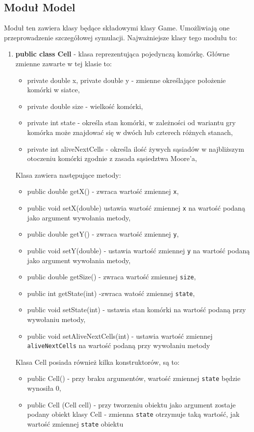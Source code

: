 \documentclass[10pt, oneside]{article}
\begin{document}
\subsection {Moduł Model}
Moduł ten zawiera klasy będące składowymi klasy Game. Umożliwiają one przeprowadzenie szczegółowej symulacji. Najważniejsze klasy tego modułu to:
\begin {enumerate}
\item  \textbf{ public class Cell} - klasa reprezentująca pojedynczą komórkę. Główne zmienne zawarte w tej klasie to:
	\begin{itemize}
		\item private double x, private double y - zmienne określające położenie komórki w siatce,
		\item private double size -  wielkość komórki,
		\item private int state -  określa stan komórki, w zależności od wariantu gry komórka może znajdować się w dwóch lub czterech różnych stanach,
		\item private int aliveNextCells - określa ilość żywych sąsiadów w najbliższym otoczeniu komórki zgodnie z zasada sąsiedztwa Moore'a,
	\end{itemize}
	
	Klasa zawiera następujące metody:
	\begin{itemize}
	\item public double getX() - zwraca wartość zmiennej \texttt{x},
	\item public void setX(double)  ustawia wartość zmiennej \texttt {x} na wartość podaną jako argument wywołania metody,
	\item public double getY() - zwraca wartość zmiennej \texttt{y},
	\item  public void setY(double) - ustawia wartość zmiennej \texttt{y}  na wartość podaną jako argument wywołania metody,
	\item  public double getSize() - zwraca wartość zmiennej \texttt{size},
	\item public int getState(int) -zwraca watość zmiennej \texttt{state},
	\item public void setState(int) - ustawia stan komórki na wartość podaną przy wywołaniu metody,
	\item public void setAliveNextCells(int) - ustawia wartość zmiennej \texttt {aliveNextCells} na wartość podaną przy wywołaniu metody
	\end{itemize}

	Klasa Cell posiada również kilka konstruktorów, są to:
	\begin{itemize}
	\item public Cell() - przy braku argumentów, wartość zmiennej \texttt{state} będzie wynosiła 0,
	\item public Cell (Cell cell) - przy tworzeniu obiektu jako argument zostaje podany obiekt klasy Cell - zmienna \texttt{state} otrzymuje taką wartość, jak wartość zmiennej \texttt {state} obiektu 
	\end{itemize}



\end{enumerate}
\end{document}
